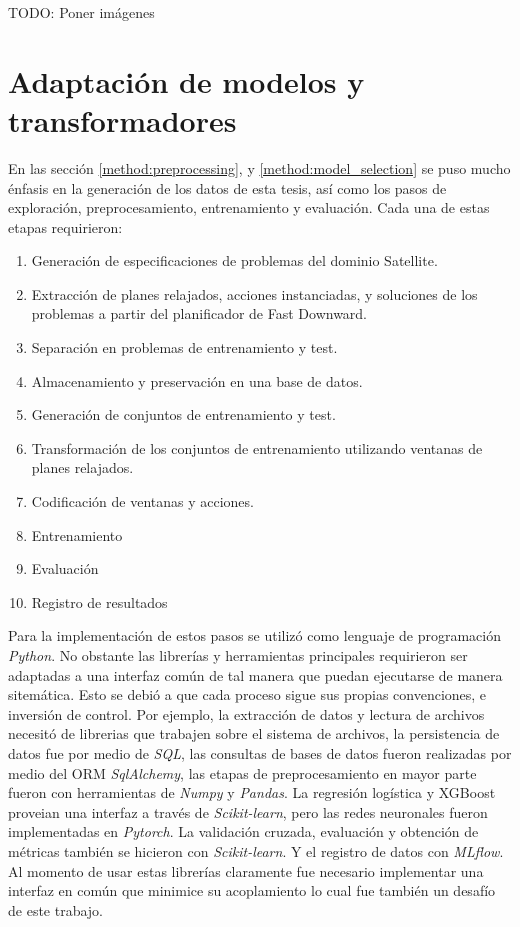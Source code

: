 TODO: Poner imágenes

\section{Adaptación de modelos y transformadores}

En las sección \ref{method:preprocessing}, y \ref{method:model_selection} se
puso mucho énfasis en la generación de los datos de esta tesis, así como los
pasos de exploración, preprocesamiento, entrenamiento y evaluación. Cada una de
estas etapas requirieron:

\begin{enumerate}
    \item Generación de especificaciones de problemas del dominio Satellite.
    \item Extracción de planes relajados, acciones instanciadas, y soluciones de
    los problemas a partir del planificador de Fast Downward.
    \item Separación en problemas de entrenamiento y test.
    \item Almacenamiento y preservación en una base de datos.
    \item Generación de conjuntos de entrenamiento y test.
    \item Transformación de los conjuntos de entrenamiento utilizando ventanas
    de planes relajados.
    \item Codificación de ventanas y acciones.
    \item Entrenamiento
    \item Evaluación
    \item Registro de resultados
\end{enumerate}

Para la implementación de estos pasos se utilizó como lenguaje de programación
\emph{Python}. No obstante las librerías y herramientas principales requirieron
ser adaptadas a una interfaz común de tal manera que puedan ejecutarse de manera
sitemática. Esto se debió a que cada proceso sigue sus propias convenciones, e
inversión de control. Por ejemplo, la extracción de datos y lectura de archivos
necesitó de librerias que trabajen sobre el sistema de archivos, la persistencia
de datos fue por medio de \emph{SQL}, las consultas de bases de datos fueron
realizadas por medio del ORM \emph{SqlAlchemy}, las etapas de preprocesamiento
en mayor parte fueron con herramientas de \emph{Numpy} y \emph{Pandas}. La
regresión logística y XGBoost proveian una interfaz a través de
\emph{Scikit-learn}, pero las redes neuronales fueron implementadas en
\emph{Pytorch}. La validación cruzada, evaluación y obtención de métricas
también se hicieron con \emph{Scikit-learn}. Y el registro de datos con
\emph{MLflow}. Al momento de usar estas librerías claramente fue necesario
implementar una interfaz en común que minimice su acoplamiento lo cual fue
también un desafío de este trabajo.